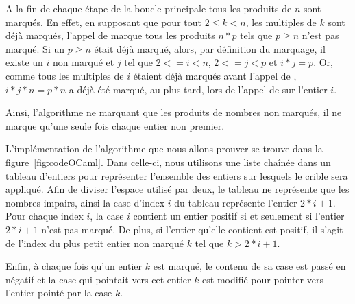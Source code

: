 \documentclass[a4paper]{easychair}
\begin{document}
A la fin de chaque étape de la boucle principale tous les produits de $n$ sont
marqués. En effet, en supposant que pour tout $2 \leq k < n$, les multiples de $k$
sont déjà marqués, l'appel de  marque tous les produits
$n * p$ tels que $p \geq n$ n'est pas marqué. Si un $p \geq n$ était déjà marqué,
alors, par définition du marquage, il existe un $i$ non marqué et $j$ tel que
$2 <= i < n$, $2 <= j < p$ et $i * j = p$. Or, comme tous les multiples de $i$
étaient déjà marqués avant l'appel de , $i * j * n = p * n$
a déjà été marqué, au plus tard, lors de l'appel de  sur
l'entier $i$.

Ainsi, l'algorithme ne marquant que les produits de nombres non marqués, il ne
marque qu'une seule fois chaque entier non premier.

L'implémentation de l'algorithme que nous allons prouver se trouve dans la
figure~\ref{fig:codeOCaml}. Dans celle-ci, nous utilisons une liste chaînée
dans un tableau d'entiers pour représenter l'ensemble des entiers sur lesquels
le crible sera appliqué.
Afin de diviser l'espace utilisé par deux, le tableau ne représente que les nombres
impairs, ainsi la case d'index $i$ du tableau représente l'entier $2 * i + 1$.
Pour chaque index $i$, la case $i$ contient un entier positif si et
seulement si l'entier $2 * i + 1$ n'est pas marqué.
De plus, si l'entier qu'elle contient est positif, il s'agit de l'index du plus
petit entier non marqué $k$ tel que $k > 2 * i + 1$.

Enfin, à chaque fois qu'un entier $k$ est marqué, le contenu de sa case est passé
en négatif et la case qui pointait vers cet entier $k$ est modifié pour pointer
vers l'entier pointé par la case $k$.
\end{document}
